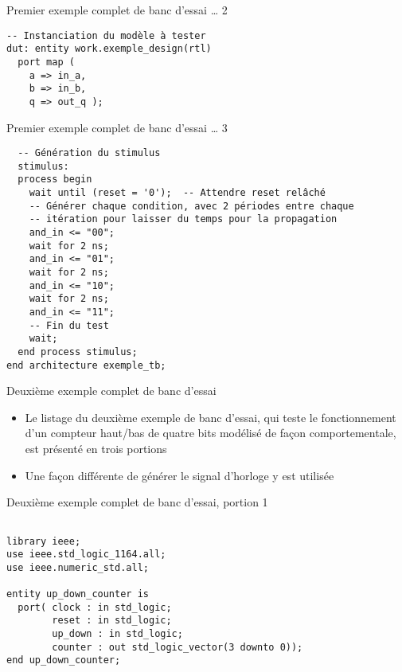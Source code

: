 \documentclass[presentation]{beamer}
\begin{document}
\begin{frame}[label={sec:org28efe50},fragile]{Premier exemple complet de banc d'essai \ldots{} 2}
 \begin{verbatim}
-- Instanciation du modèle à tester 
dut: entity work.exemple_design(rtl)
  port map (
    a => in_a,
    b => in_b,
    q => out_q );
\end{verbatim}
\end{frame}


\begin{frame}[label={sec:org8a270cc},fragile]{Premier exemple complet de banc d'essai \ldots{} 3}
 \begin{verbatim}
  -- Génération du stimulus
  stimulus:
  process begin
    wait until (reset = '0');  -- Attendre reset relâché
    -- Générer chaque condition, avec 2 périodes entre chaque
    -- itération pour laisser du temps pour la propagation
    and_in <= "00";
    wait for 2 ns;
    and_in <= "01";
    wait for 2 ns;
    and_in <= "10";
    wait for 2 ns;
    and_in <= "11";
    -- Fin du test
    wait;
  end process stimulus;
end architecture exemple_tb;
\end{verbatim}
\end{frame}

\begin{frame}[label={sec:org0886328}]{Deuxième exemple complet de banc d'essai}
\begin{itemize}
\item Le listage du deuxième exemple de banc d'essai, qui teste le fonctionnement d'un compteur haut/bas de quatre bits modélisé de façon comportementale, est présenté en trois portions
\item Une façon différente de générer le signal d'horloge y est utilisée
\end{itemize}
\end{frame}

\begin{frame}[label={sec:orgd03568c},fragile]{Deuxième exemple complet de banc d'essai, portion 1}
 \begin{verbatim}

library ieee;
use ieee.std_logic_1164.all;
use ieee.numeric_std.all;

entity up_down_counter is
  port( clock : in std_logic;
        reset : in std_logic;
        up_down : in std_logic;
        counter : out std_logic_vector(3 downto 0));
end up_down_counter;

\end{verbatim}
\end{frame}
\end{document}
